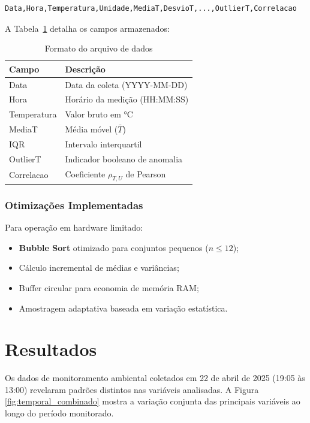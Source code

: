 \documentclass[12pt, a4paper]{article}
\begin{document}
\begin{verbatim}
Data,Hora,Temperatura,Umidade,MediaT,DesvioT,...,OutlierT,Correlacao
\end{verbatim}

A Tabela~\ref{tab:formato_dados} detalha os campos armazenados:

\begin{table}[ht]
    \centering
    \caption{Formato do arquivo de dados}
    \label{tab:formato_dados}
    \begin{tabular}{|l|l|}
        \hline
        Campo & Descrição \\ \hline
        \hline
        Data & Data da coleta (YYYY-MM-DD) \\
        \hline
        Hora & Horário da medição (HH:MM:SS) \\
        \hline
        Temperatura & Valor bruto em °C \\
        \hline
        MediaT & Média móvel ($\bar{T}$) \\
        \hline
        IQR & Intervalo interquartil \\
        \hline
        OutlierT & Indicador booleano de anomalia \\
        \hline
        Correlacao & Coeficiente $\rho_{T,U}$ de Pearson \\ \hline
    \end{tabular}
\end{table}

\subsubsection{Otimizações Implementadas}
Para operação em hardware limitado:

\begin{itemize}
    \item \textbf{Bubble Sort} otimizado para conjuntos pequenos ($n \leq 12$);
    \item Cálculo incremental de médias e variâncias;
    \item Buffer circular para economia de memória RAM;
    \item Amostragem adaptativa baseada em variação estatística.
\end{itemize}

\section{Resultados}
\label{sec:resultados}

Os dados de monitoramento ambiental coletados em 22 de abril de 2025 (19:05 às 13:00) revelaram padrões distintos nas variáveis analisadas. A Figura \ref{fig:temporal_combinado} mostra a variação conjunta das principais variáveis ao longo do período monitorado.
\end{document}
